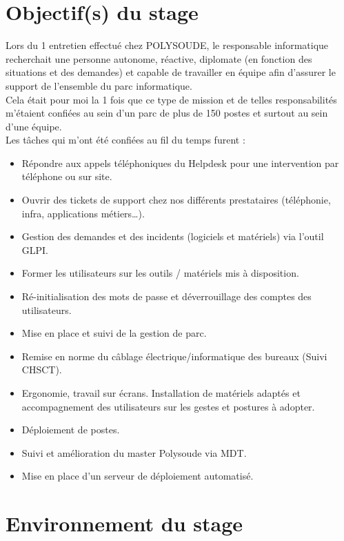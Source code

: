 \documentclass[11pt,a4paper,oneside]{article}
\begin{document}
\newpage
\section{Objectif(s) du stage}

Lors du 1\ier{} entretien effectué chez POLYSOUDE, le responsable informatique recherchait une personne autonome, réactive, diplomate (en fonction des situations et des demandes) et capable de travailler en équipe afin d’assurer le support de l’ensemble du parc informatique.\\

Cela était pour moi la 1\ier{} fois que ce type de mission et de telles responsabilités m’étaient confiées au sein d’un parc de plus de 150 postes et surtout au sein d’une équipe.\\

Les tâches qui m’ont été confiées au fil du temps furent : \\
\begin{itemize}
    \item Répondre aux appels téléphoniques du Helpdesk pour une intervention par téléphone ou sur site.
    \item Ouvrir des tickets de support chez nos différents prestataires (téléphonie, infra, applications métiers…).
    \item Gestion des demandes et des incidents (logiciels et matériels) via l’outil GLPI.
    \item Former les utilisateurs sur les outils / matériels mis à disposition.
    \item Ré-initialisation des mots de passe et déverrouillage des comptes des     utilisateurs.
    \item Mise en place et suivi de la gestion de parc.
    \item Remise en norme du câblage électrique/informatique des bureaux (Suivi CHSCT). 
    \item Ergonomie, travail sur écrans. Installation de matériels adaptés et accompagnement des utilisateurs sur les gestes et postures à adopter. 
    \item Déploiement de postes.
    \item Suivi et amélioration du master Polysoude via MDT.
    \item Mise en place d’un serveur de déploiement automatisé.

\end{itemize}

\newpage
\section{Environnement du stage}
\end{document}
